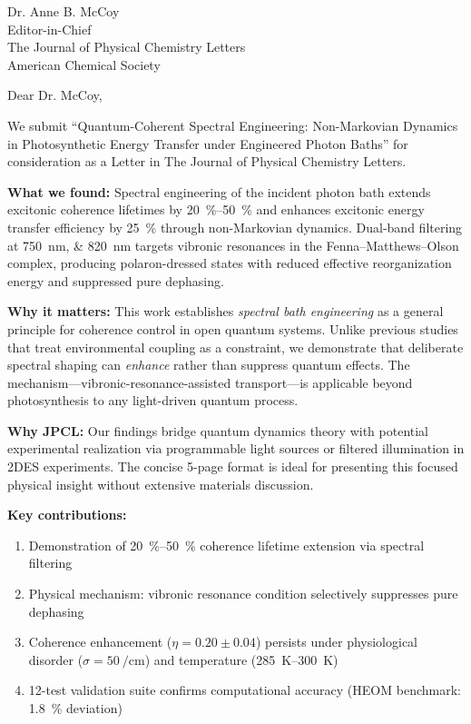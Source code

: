 \documentclass[11pt,a4paper]{letter}
\begin{document}
\begin{letter}{
Dr. Anne B. McCoy\\
Editor-in-Chief\\
The Journal of Physical Chemistry Letters\\
American Chemical Society
}

\opening{Dear Dr. McCoy,}

We submit ``Quantum-Coherent Spectral Engineering: Non-Markovian Dynamics in Photosynthetic Energy Transfer under Engineered Photon Baths'' for consideration as a Letter in The Journal of Physical Chemistry Letters.

\textbf{What we found:} Spectral engineering of the incident photon bath extends excitonic coherence lifetimes by \SIrange{20}{50}{\percent} and enhances excitonic energy transfer efficiency by \SI{25}{\percent} through non-Markovian dynamics. Dual-band filtering at \SIlist{750;820}{\nano\meter} targets vibronic resonances in the Fenna--Matthews--Olson complex, producing polaron-dressed states with reduced effective reorganization energy and suppressed pure dephasing.

\textbf{Why it matters:} This work establishes \textit{spectral bath engineering} as a general principle for coherence control in open quantum systems. Unlike previous studies that treat environmental coupling as a constraint, we demonstrate that deliberate spectral shaping can \textit{enhance} rather than suppress quantum effects. The mechanism---vibronic-resonance-assisted transport---is applicable beyond photosynthesis to any light-driven quantum process.

\textbf{Why JPCL:} Our findings bridge quantum dynamics theory with potential experimental realization via programmable light sources or filtered illumination in 2DES experiments. The concise 5-page format is ideal for presenting this focused physical insight without extensive materials discussion.

\textbf{Key contributions:}
\begin{enumerate}
\item Demonstration of \SIrange{20}{50}{\percent} coherence lifetime extension via spectral filtering
\item Physical mechanism: vibronic resonance condition selectively suppresses pure dephasing
\item Coherence enhancement ($\eta = 0.20 \pm 0.04$) persists under physiological disorder ($\sigma = \SI{50}{\per\centi\meter}$) and temperature (\SIrange{285}{300}{\kelvin})
\item 12-test validation suite confirms computational accuracy (HEOM benchmark: \SI{1.8}{\percent} deviation)
\end{enumerate}


\end{letter}
\end{document}
